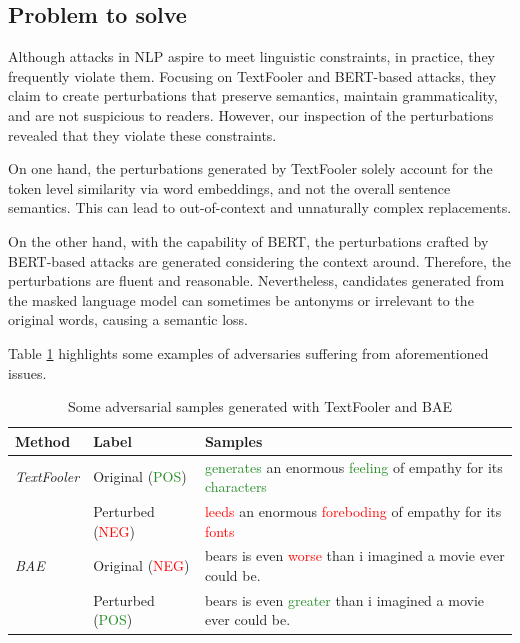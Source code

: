 \subsection{Problem to solve}\label{subsec:problem-to-solve}
Although attacks in NLP aspire to meet linguistic constraints, in practice, they frequently violate them.
Focusing on TextFooler and BERT-based attacks, they claim to create perturbations that preserve semantics, maintain grammaticality, and are not suspicious to readers. 
However, our inspection of the perturbations revealed that they violate these constraints.

On one hand, the perturbations generated by TextFooler solely account for the token level similarity via word embeddings, and not the overall sentence semantics. This can lead to out-of-context and unnaturally complex replacements.

On the other hand, with the capability of BERT, the perturbations crafted by BERT-based attacks are generated considering the context around. Therefore, the perturbations are fluent and reasonable.
Nevertheless, candidates generated from the masked language model can sometimes be antonyms or irrelevant to the original words, causing a semantic loss.

Table \ref{tab:3_1_wrong_adversarial_examples} highlights some examples of adversaries suffering from aforementioned issues.

\begin{table}[h]
    \footnotesize
    \centering
    \begin{tabularx}{\textwidth}{|l||l|X|}
      \hline
      \textbf{Method} & \textbf{Label}  & \textbf{Samples} \\
      \hline \hline
      \emph{TextFooler} & Original (\textcolor{ForestGreen}{POS}) & \textcolor{ForestGreen}{generates} an enormous \textcolor{ForestGreen}{feeling} of empathy for its \textcolor{ForestGreen}{characters} \\
                 & Perturbed (\textcolor{red}{NEG}) & \textcolor{red}{leeds} an enormous \textcolor{red}{foreboding} of empathy for its \textcolor{red}{fonts}
                 \\
      \hline
     
      \emph{BAE} & Original (\textcolor{red}{NEG}) & bears is even \textcolor{red}{worse} than i imagined a movie ever could be.     \\
      & Perturbed (\textcolor{ForestGreen}{POS}) & bears is even \textcolor{ForestGreen}{greater} than i imagined a movie ever could be.
    \\
        
      \hline
    \end{tabularx}
    \caption{Some adversarial samples generated with TextFooler and BAE}
  \label{tab:3_1_wrong_adversarial_examples}
\end{table}

